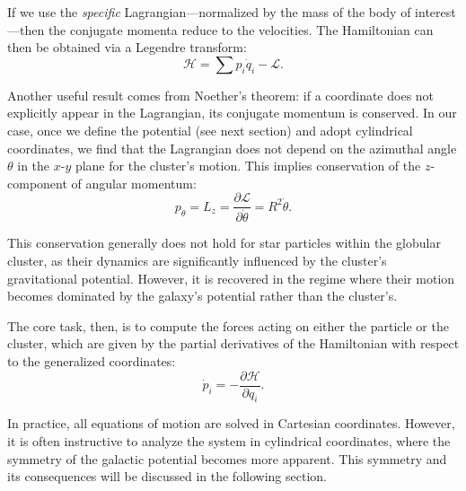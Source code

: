         If we use the \textit{specific} Lagrangian—normalized by the mass of the body of interest—then the conjugate momenta reduce to the velocities. The Hamiltonian can then be obtained via a Legendre transform:
        \begin{equation}
            \mathcal{H} = \sum p_i \dot{q}_i - \mathcal{L}.
        \end{equation}

        Another useful result comes from Noether's theorem: if a coordinate does not explicitly appear in the Lagrangian, its conjugate momentum is conserved. In our case, once we define the potential (see next section) and adopt cylindrical coordinates, we find that the Lagrangian does not depend on the azimuthal angle \( \theta \) in the \(x\text{-}y\) plane for the cluster's motion. This implies conservation of the \(z\)-component of angular momentum:
        \begin{equation}
            p_\theta = L_z = \frac{\partial \mathcal{L}}{\partial \dot{\theta}} = R^2 \dot{\theta}.
        \end{equation}

        This conservation generally does not hold for star particles within the globular cluster, as their dynamics are significantly influenced by the cluster's gravitational potential. However, it is recovered in the regime where their motion becomes dominated by the galaxy's potential rather than the cluster's. 

        The core task, then, is to compute the forces acting on either the particle or the cluster, which are given by the partial derivatives of the Hamiltonian with respect to the generalized coordinates:
        \begin{equation}
            \dot{p}_i = -\frac{\partial \mathcal{H}}{\partial q_i}.
        \end{equation}

        In practice, all equations of motion are solved in Cartesian coordinates. However, it is often instructive to analyze the system in cylindrical coordinates, where the symmetry of the galactic potential becomes more apparent. This symmetry and its consequences will be discussed in the following section.


        


